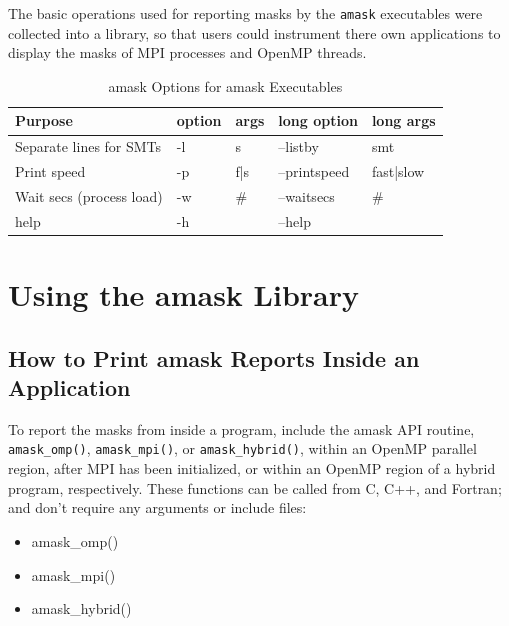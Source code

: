 \documentclass[10pt,a4paper]{report}
\begin{document}

The basic operations used for reporting masks by the \verb+amask+ executables
were collected into a library, so that users
could instrument there own applications to display the masks of MPI processes
and OpenMP threads.

\begin{table}[ht]
\centering
\caption{amask Options for amask Executables}
\label{tab:amaskopts}
\begin{tabular}{|l|l|l|l|l|}
\hline
Purpose                  & option & args & long option  & long args  \\ \hline
Separate lines for SMTs  & -l     & s    & --listby     & smt        \\ \hline
Print speed              & -p     & f|s  & --printspeed & fast|slow  \\ \hline
Wait secs (process load) & -w     & \#   & --waitsecs   & \#         \\ \hline
help                     & -h     &      & --help       &            \\ \hline
\end{tabular}
\end{table}


\chapter{Using the amask Library}


\section{How to Print amask Reports Inside an Application}

To report the masks from inside a program, include the amask API routine, \verb+amask_omp()+,
\verb+amask_mpi()+, or \verb+amask_hybrid()+, within an OpenMP parallel region, after MPI has been
initialized, or within an OpenMP region of a hybrid program, respectively.  These functions can
be called from C, C++, and Fortran; and don't require any arguments or include files:  

\begin{itemize}
\item amask\_omp()
\item amask\_mpi()
\item amask\_hybrid()
\end{itemize}
\end{document}
